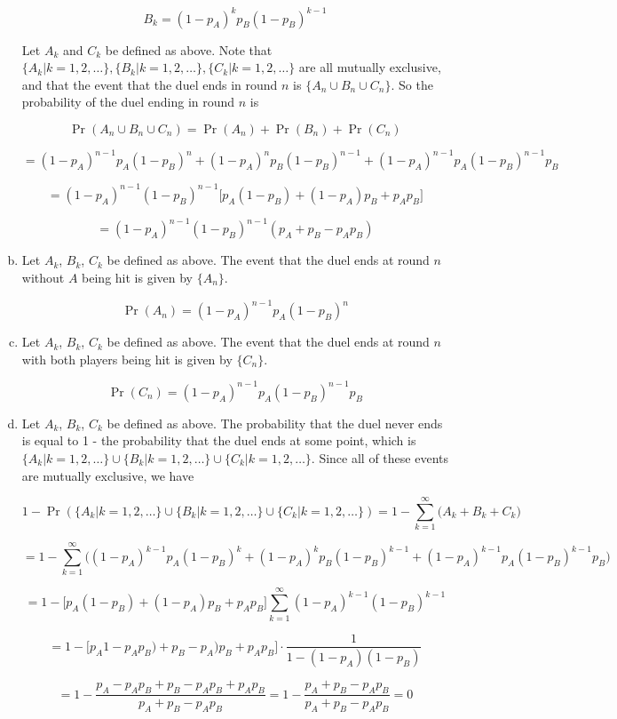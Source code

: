 \begin{enumerate}[(a)]
\[
B_k = (1 - p_A)^{{k}}p_B(1 - p_B)^{k-1}
\]

Let \(A_k\) and \(C_k\) be defined as above. Note that \(\{A_k | k = 1, 2, \ldots\} , \{B_k | k = 1, 2, \ldots\}, \{C_k | k = 1, 2, \ldots\}\) are all mutually exclusive, and that the event that the duel ends in round \(n\) is \(\{A_n \cup B_n \cup C_n\}\). So the probability of the duel ending in round \(n\) is

\[
\Pr(A_n \cup B_n \cup C_n) = \Pr(A_n) + \Pr(B_n) + \Pr(C_n) 
\]

\[
= (1 - p_A)^{n-1}p_A(1 - p_B)^{n} + (1 - p_A)^{{n}}p_B(1 - p_B)^{n-1} + (1 - p_A)^{{n-1}}p_A(1 - p_B)^{n-1}p_B
\]

\[
= (1 - p_A)^{n-1}(1 - p_B)^{n-1} \big[p_A(1 - p_B) + (1 - p_A)p_B + p_Ap_B \big]
\]

\[
= \boxed{(1 - p_A)^{n-1}(1 - p_B)^{n-1} (p_A + p_B - p_Ap_B )}
\]

\item Let \(A_k\), \(B_k\), \(C_k\) be defined as above. The event that the duel ends at round \(n\) without \(A\) being hit is given by \(\{ A_n\} \). 

\[
\Pr(A_n) = \boxed{(1 - p_A)^{{n-1}}p_A(1 - p_B)^{n}}
\]

\item Let \(A_k\), \(B_k\), \(C_k\) be defined as above. The event that the duel ends at round \(n\) with both players being hit is given by \(\{ C_n\} \). 

\[
\Pr(C_n) = \boxed{(1 - p_A)^{{n-1}}p_A(1 - p_B)^{n-1}p_B}
\]

\item Let \(A_k\), \(B_k\), \(C_k\) be defined as above. The probability that the duel never ends is equal to 1 - the probability that the duel ends at some point, which is  \(\{A_k | k = 1, 2, \ldots\} \cup \{B_k | k = 1, 2, \ldots\} \cup \{C_k | k = 1, 2, \ldots\}\). Since all of these events are mutually exclusive, we have

\[
1 - \Pr(\{A_k | k = 1, 2, \ldots\} \cup \{B_k | k = 1, 2, \ldots\} \cup \{C_k | k = 1, 2, \ldots\}) = 1 - \sum_{k = 1}^\infty \big(A_k + B_k + C_k\big)
\]

\[
= 1 - \sum_{k=1}^\infty \big( (1 - p_A)^{{k-1}}p_A(1 - p_B)^{k} + (1 - p_A)^{{k}}p_B(1 - p_B)^{k-1} + (1 - p_A)^{{k-1}}p_A(1 - p_B)^{k-1}p_B \big)
\]

\[
= 1 -   \big[p_A(1 - p_B) + (1 - p_A)p_B + p_Ap_B \big] \sum_{k=1}^\infty (1 - p_A)^{k-1}(1 - p_B)^{k-1} 
\]

\[
=  1 -  \big[ p_A1 - p_A p_B) + p_B - p_A)p_B + p_Ap_B \big] \cdot \frac{1}{1 - (1 - p_A)(1 - p_B)}
\]

\[
=1 -  \frac{p_A - p_Ap_B + p_B - p_Ap_B + p_Ap_B}{p_A + p_B - p_Ap_B} = 1 -  \frac{p_A + p_B - p_Ap_B}{p_A + p_B - p_Ap_B} = \boxed{0}
\]

\end{enumerate}


